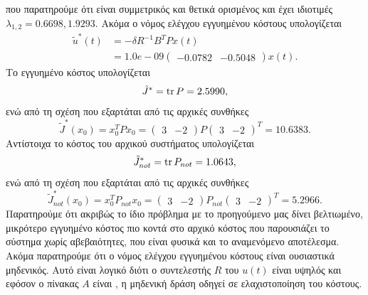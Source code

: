 που παρατηρούμε ότι είναι συμμετρικός και θετικά ορισμένος και έχει ιδιοτιμές
\( \lambda_{1,2} = 0.6698, 1.9293 \). Ακόμα ο νόμος ελέγχου εγγυημένου κόστους
υπολογίζεται
\begin{align*}
    \tilde{u}^*(t) &=
    -\delta R^{-1} B^T P x(t) \\
    &= 1.0e-09
    \begin{pmatrix}
        -0.0782 & -0.5048
    \end{pmatrix}x(t).
\end{align*}
Το εγγυημένο κόστος υπολογίζεται
\[
    \tilde{J}^* = \operatorname{tr}{P} = 2.5990,
\]
ενώ από τη σχέση που εξαρτάται από τις αρχικές συνθήκες
\[
    \tilde{J}^*(x_0) = x_0^{T}Px_0 =
    \begin{pmatrix}
        3 & -2
    \end{pmatrix}P
    \begin{pmatrix}
        3 & -2
    \end{pmatrix}^T = 10.6383.
\]
Αντίστοιχα το κόστος του αρχικού συστήματος υπολογίζεται
\[
    \tilde{J}^*_{not} = \operatorname{tr}{P}_{not} = 1.0643,
\]
ενώ από τη σχέση που εξαρτάται από τις αρχικές συνθήκες
\[
    \tilde{J}^*_{not}(x_0) = x_0^{T}P_{not}x_0 =
    \begin{pmatrix}
        3 & -2
    \end{pmatrix}P_{not}
    \begin{pmatrix}
        3 & -2
    \end{pmatrix}^T = 5.2966.
\]
Παρατηρούμε ότι ακριβώς το ίδιο πρόβλημα με το προηγούμενο μας δίνει βελτιωμένο,
μικρότερο εγγυημένο κόστος πιο κοντά στο αρχικό κόστος που παρουσιάζει το
σύστημα χωρίς αβεβαιότητες, που είναι φυσικά και το αναμενόμενο αποτέλεσμα.
Ακόμα παρατηρούμε ότι ο νόμος ελέγχου εγγυημένου κόστους είναι ουσιαστικά
μηδενικός. Αυτό είναι λογικό διότι ο συντελεστής \( R \) του \( u(t) \) είναι
υψηλός και εφόσον ο πίνακας \( A \) είναι , η μηδενική δράση οδηγεί
σε ελαχιστοποίηση του κόστους.

